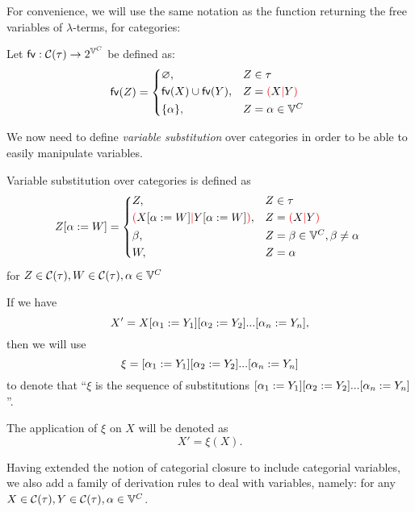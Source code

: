 \documentclass[main.tex]{subfiles}
\begin{document}
For convenience, we will use the same notation as the function returning the free variables of $\lambda$-terms, for categories:
\begin{defn}
    Let $\mathsf{fv} : \mathcal{C}( \tau ) \rightarrow 2^{\mathbb{V}^{C}}$ be defined as:
    \[
        \fv{Z} =
        \begin{cases*}
            \varnothing ,& $Z \in \tau$ \\
            \fv{X} \cup \fv{Y} ,& $Z = \lp X \mc Y \rp$ \\
            \{ \alpha \} ,& $Z = \alpha \in \cvars$ \\
        \end{cases*}
    \]
\end{defn}

We now need to define \emph{variable substitution} over categories in order
to be able to easily manipulate variables.
\begin{defn}
    Variable substitution over categories is defined as
    \[
        \subst{Z}{\alpha}{W} =
        \begin{cases*}
            Z ,& $Z \in \tau$ \\
            \lp \subst{X}{\alpha}{W} \mc \subst{Y}{\alpha}{W} \rp ,& $Z = \lp X \mc Y \rp$ \\
            \beta ,& $Z = \beta \in \cvars, \beta \neq \alpha$ \\
            W ,& $Z = \alpha$ \\
        \end{cases*}
    \]
    for $Z \in \mathcal{C}( \tau ), W \in \mathcal{C}( \tau ), \alpha \in \mathbb{V}^{C}$
\end{defn}

\begin{convention}
    If we have
    \[ X' = X [ \alpha_1 := Y_1 ] [ \alpha_2 := Y_2 ]... [ \alpha_n := Y_n ], \]
    then we will use
    \[ \xi =  [ \alpha_1 := Y_1 ] [ \alpha_2 := Y_2 ]... [ \alpha_n := Y_n ] \]
    to denote that ``$\xi$ is the sequence of substitutions
    $ [ \alpha_1 := Y_1 ] [ \alpha_2 := Y_2 ]... [ \alpha_n := Y_n ]$''.

    The application of $\xi$ on $X$ will be denoted as
    \[ X' = \xi(X). \]
\end{convention}

Having extended the notion of categorial closure to include categorial variables,
we also add a family of derivation rules to deal with variables, namely:
for any $X \in \mathcal{C}( \tau ), Y \in \mathcal{C}( \tau ), \alpha \in \mathbb{V}^{C}$.
\end{document}
